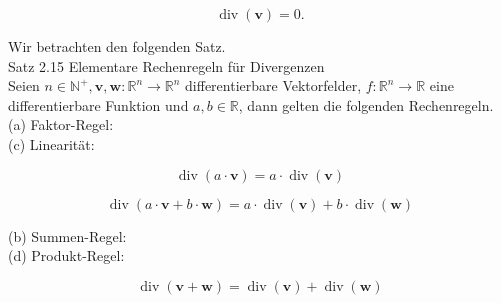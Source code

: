 \documentclass[10pt]{article}
\begin{document}
\begin{equation*}
\operatorname{div}(\mathbf{v})=0 . \tag{2.153}
\end{equation*}


Wir betrachten den folgenden Satz.\\
Satz 2.15 Elementare Rechenregeln für Divergenzen\\
Seien $n \in \mathbb{N}^{+}, \mathbf{v}, \mathbf{w}: \mathbb{R}^{n} \rightarrow \mathbb{R}^{n}$ differentierbare Vektorfelder, $f: \mathbb{R}^{n} \rightarrow \mathbb{R}$ eine differentierbare Funktion und $a, b \in \mathbb{R}$, dann gelten die folgenden Rechenregeln.\\
(a) Faktor-Regel:\\
(c) Linearität:

$$
\operatorname{div}(a \cdot \mathbf{v})=a \cdot \operatorname{div}(\mathbf{v})
$$

$$
\operatorname{div}(a \cdot \mathbf{v}+b \cdot \mathbf{w})=a \cdot \operatorname{div}(\mathbf{v})+b \cdot \operatorname{div}(\mathbf{w})
$$

(b) Summen-Regel:\\
(d) Produkt-Regel:

$$
\operatorname{div}(\mathbf{v}+\mathbf{w})=\operatorname{div}(\mathbf{v})+\operatorname{div}(\mathbf{w})
$$
\end{document}
